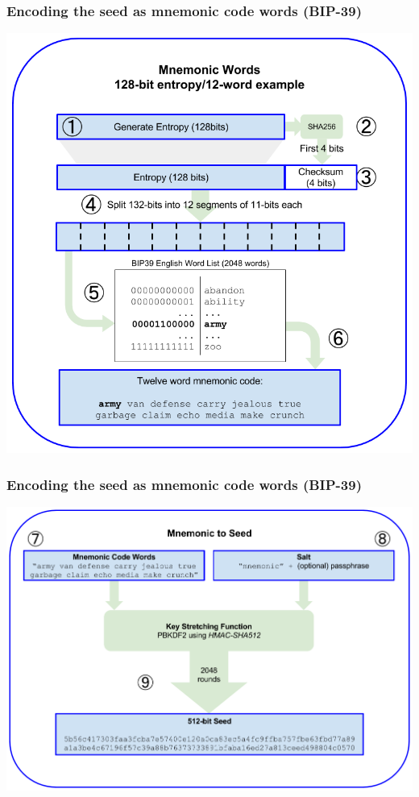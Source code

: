 \documentclass[11pt]{beamer}  %
\begin{document}
\begin{frame}\frametitle{Encoding the seed as mnemonic code words (BIP-39)}

  \begin{center}
    \includegraphics[scale=0.27,clip=false]{pictures/entropy-to-mnemonic.png}
  \end{center}

\end{frame}

\begin{frame}\frametitle{Encoding the seed as mnemonic code words (BIP-39)}

  \begin{center}
    \includegraphics[scale=0.3,clip=false]{pictures/mnemonic-to-seed.png}
  \end{center}

\end{frame}
\end{document}
